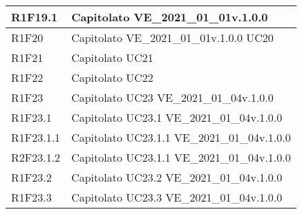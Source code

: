 \begin{center}
\begin{longtable}{|p{22mm}|p{44mm}|}
R1F19.1 &
Capitolato \newline
VE\_2021\_01\_01v.1.0.0 \newline
\\
\hline

R1F20 &
Capitolato \newline
VE\_2021\_01\_01v.1.0.0 \newline
UC20 \newline
\\
\hline

R1F21 &
Capitolato \newline
UC21 \newline
\\
\hline

R1F22 &
Capitolato \newline
UC22 \newline
\\
\hline

R1F23 &
Capitolato \newline
UC23 \newline
VE\_2021\_01\_04v.1.0.0 \newline
\\
\hline

R1F23.1 &
Capitolato \newline
UC23.1 \newline
VE\_2021\_01\_04v.1.0.0 \newline
\\
\hline

R1F23.1.1 &
Capitolato \newline
UC23.1.1 \newline
VE\_2021\_01\_04v.1.0.0 \newline
\\
\hline

R2F23.1.2 &
Capitolato \newline
UC23.1.1 \newline
VE\_2021\_01\_04v.1.0.0 \newline
\\
\hline

R1F23.2 &
Capitolato \newline
UC23.2 \newline
VE\_2021\_01\_04v.1.0.0 \newline
\\
\hline

R1F23.3 &
Capitolato \newline
UC23.3 \newline
VE\_2021\_01\_04v.1.0.0 \newline
\\
\hline


\end{longtable}
\end{center}
